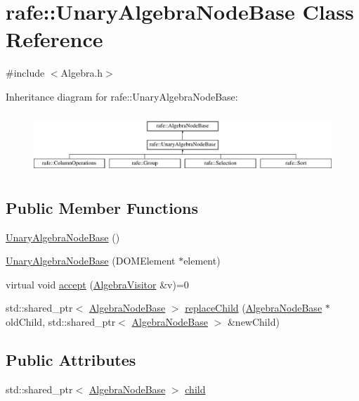 \hypertarget{classrafe_1_1_unary_algebra_node_base}{\section{rafe\+:\+:Unary\+Algebra\+Node\+Base Class Reference}
\label{classrafe_1_1_unary_algebra_node_base}
}


{\ttfamily \#include $<$Algebra.\+h$>$}

Inheritance diagram for rafe\+:\+:Unary\+Algebra\+Node\+Base\+:\begin{figure}[H]
\begin{center}
\leavevmode
\includegraphics[height=2.258065cm]{classrafe_1_1_unary_algebra_node_base}
\end{center}
\end{figure}
\subsection*{Public Member Functions}
\begin{DoxyCompactItemize}
\item 
\hyperlink{classrafe_1_1_unary_algebra_node_base_a26d7a253735fefa024015a6f2dc91052}{Unary\+Algebra\+Node\+Base} ()
\item 
\hyperlink{classrafe_1_1_unary_algebra_node_base_ace21dbea5b5612e87017caeb2cb86681}{Unary\+Algebra\+Node\+Base} (D\+O\+M\+Element $\ast$element)
\item 
virtual void \hyperlink{classrafe_1_1_unary_algebra_node_base_a6f554aad7250a0f15730d10ae24e4a79}{accept} (\hyperlink{classrafe_1_1_algebra_visitor}{Algebra\+Visitor} \&v)=0
\item 
std\+::shared\+\_\+ptr$<$ \hyperlink{classrafe_1_1_algebra_node_base}{Algebra\+Node\+Base} $>$ \hyperlink{classrafe_1_1_unary_algebra_node_base_a32662d50e21fdc214d8acceb7e1029cc}{replace\+Child} (\hyperlink{classrafe_1_1_algebra_node_base}{Algebra\+Node\+Base} $\ast$old\+Child, std\+::shared\+\_\+ptr$<$ \hyperlink{classrafe_1_1_algebra_node_base}{Algebra\+Node\+Base} $>$ \&new\+Child)
\end{DoxyCompactItemize}
\subsection*{Public Attributes}
\begin{DoxyCompactItemize}
\item 
std\+::shared\+\_\+ptr$<$ \hyperlink{classrafe_1_1_algebra_node_base}{Algebra\+Node\+Base} $>$ \hyperlink{classrafe_1_1_unary_algebra_node_base_a8f7f43824366a5efbc9c169293a998d3}{child}
\end{DoxyCompactItemize}


